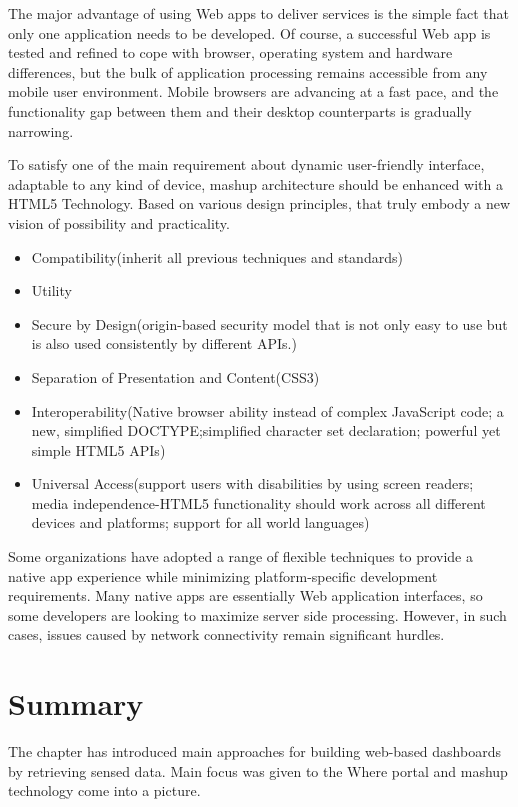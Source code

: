 The major advantage of using Web apps to deliver services is the simple fact that only one application needs to be developed. Of course, a successful Web app is tested and refined to cope with browser, operating system and hardware differences, but the bulk of application processing remains accessible from any mobile user environment. Mobile browsers are advancing at a fast pace, and the functionality gap between them and their desktop counterparts is gradually narrowing.


To satisfy one of the main requirement about dynamic user-friendly interface, adaptable to any kind of device, mashup architecture should be enhanced with a HTML5 Technology. Based on various design principles, that truly embody a new vision of possibility and practicality\cite{hickson2011html5}.
\begin{itemize}
\item Compatibility(inherit all previous techniques and standards)
\item Utility
\item Secure by Design(origin-based security model that is not only easy to use but is also used consistently by different APIs.)
\item Separation of Presentation and Content(CSS3)
\item Interoperability(Native browser ability instead of complex JavaScript code; a new, simplified DOCTYPE;simplified character set declaration; powerful yet simple HTML5 APIs)
\item Universal Access(support users with disabilities by using screen readers; media independence-HTML5 functionality should work across all different devices and platforms; support for all world languages)
\end{itemize}

Some organizations have adopted a range of flexible techniques to provide a native app experience while minimizing platform-specific development requirements. Many native apps are essentially Web application interfaces, so some developers are looking to maximize server side processing. However, in such cases, issues caused by network connectivity remain significant hurdles.


\section{Summary}
The chapter has introduced main approaches for building web-based dashboards by retrieving sensed data. Main focus was given to the  Where portal and mashup technology come into a picture. 

